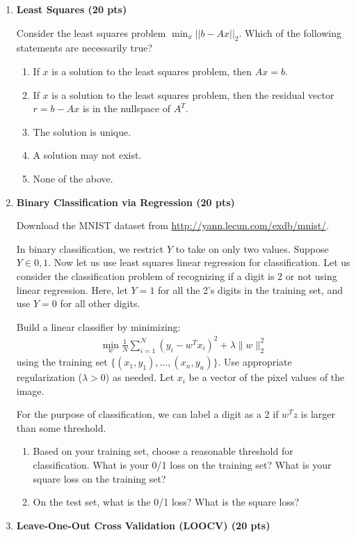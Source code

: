 \begin{enumerate}
\solution{

}
\item \textbf{Least Squares  (20 pts)}

Consider the least squares problem $\min_x ||b - A x||_2$.  Which of the following statements are
  necessarily true?
\begin{enumerate}
\item If $x$ is a solution to the least squares problem, then $Ax = b$.
\item If $x$ is a solution to the least squares problem, then the residual vector $r = b - A x$ is in the nullspace of $A^T$.
\item The solution is unique.
\item A solution may not exist.
\item None of the above.
\end{enumerate}
\solution{

}

\item \textbf{Binary Classification via Regression  (20 pts)} 

Download the MNIST dataset from \url{http://yann.lecun.com/exdb/mnist/}.

In binary classification, we restrict $Y$ to take on only two values. Suppose $Y \in 0,1$. Now let us use least squares linear regression for classification. Let us consider the classification problem of recognizing if a digit is 2 or not using linear regression. Here, let $Y=1$ for all the 2's digits in the training set, and use $Y=0$ for all other digits.

Build a linear classifier by minimizing:
\begin{align*}
    \min_w \frac{1}{N} \sum_{i=1}^N (y_i -w^T x_i)^2+ \lambda \| w\|_2^2
\end{align*}
using the training set $\{(x_1,y_1), \ldots, (x_n,y_n)\}$. Use appropriate regularization ($\lambda>0$) as needed. Let $x_i$ be a vector of the pixel values of the image.

For the purpose of classification, we can label a digit as a 2 if $w^Tz$ is larger than some threshold.
\begin{enumerate}
    \item Based on your training set, choose a reasonable threshold for classification. What is your 0/1 loss on the training set? What is your square loss on the training set?
    \item On the test set, what is the 0/1 loss? What is the square loss?
\end{enumerate}
\solution{ 
}
\item \textbf{Leave-One-Out Cross Validation (LOOCV)  (20 pts)}


\end{enumerate}
